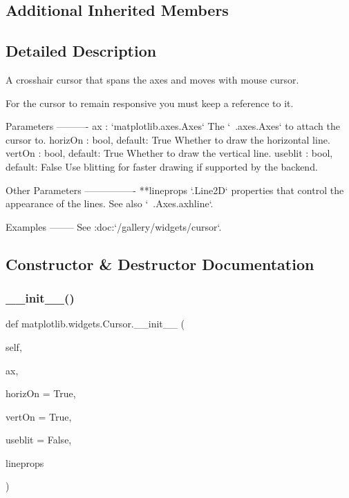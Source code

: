 \subsection*{Additional Inherited Members}


\subsection{Detailed Description}
\begin{DoxyVerb}A crosshair cursor that spans the axes and moves with mouse cursor.

For the cursor to remain responsive you must keep a reference to it.

Parameters
----------
ax : `matplotlib.axes.Axes`
    The `~.axes.Axes` to attach the cursor to.
horizOn : bool, default: True
    Whether to draw the horizontal line.
vertOn : bool, default: True
    Whether to draw the vertical line.
useblit : bool, default: False
    Use blitting for faster drawing if supported by the backend.

Other Parameters
----------------
**lineprops
    `.Line2D` properties that control the appearance of the lines.
    See also `~.Axes.axhline`.

Examples
--------
See :doc:`/gallery/widgets/cursor`.
\end{DoxyVerb}
 

\subsection{Constructor \& Destructor Documentation}
\mbox{\label{classmatplotlib_1_1widgets_1_1Cursor_af6837d4b25dadcc2460f95ea294262b5}} 
\subsubsection{\texorpdfstring{\+\_\+\+\_\+init\+\_\+\+\_\+()}{\_\_init\_\_()}}
{\footnotesize\ttfamily def matplotlib.\+widgets.\+Cursor.\+\_\+\+\_\+init\+\_\+\+\_\+ (\begin{DoxyParamCaption}\item[{}]{self,  }\item[{}]{ax,  }\item[{}]{horiz\+On = {\ttfamily True},  }\item[{}]{vert\+On = {\ttfamily True},  }\item[{}]{useblit = {\ttfamily False},  }\item[{}]{lineprops }\end{DoxyParamCaption})}



